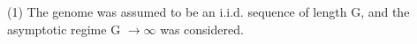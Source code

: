 \documentclass[preview]{standalone}
\begin{document}
\begin{center}
(1) The genome was assumed to be an i.i.d. sequence of length G, and the asymptotic regime G $\rightarrow \infty$ was considered.
\end{center}
\end{document}
